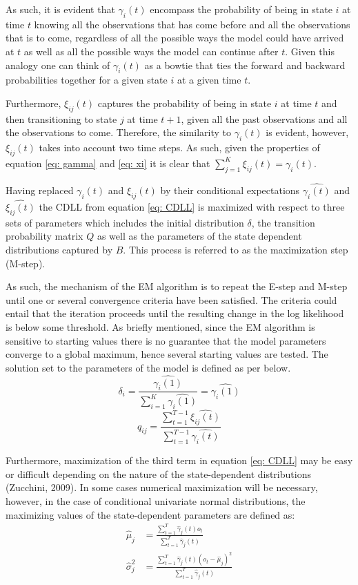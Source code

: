 As such, it is evident that $\gamma_i(t)$ encompass the probability of being in state $i$ at time $t$ knowing all the observations that has come before and all the observations that is to come, regardless of all the possible ways the model could have arrived at $t$ as well as all the possible ways the model can continue after $t$. Given this analogy one can think of $\gamma_i(t)$ as a bowtie that ties the forward and backward probabilities together for a given state $i$ at a given time $t$. 

Furthermore, $\xi_{ij}(t)$ captures the probability of being in state $i$ at time $t$ and then transitioning to state $j$ at time $t+1$, given all the past observations and all the observations to come. Therefore, the similarity to $\gamma_i(t)$ is evident, however, $\xi_{ij}(t)$ takes into account two time steps. As such, given the properties of equation \ref{eq: gamma} and \ref{eq: xi} it is clear that $\sum_{j=1}^K \xi_{ij}(t) = \gamma_i(t)$. 

Having replaced $\gamma_i(t)$ and $\xi_{ij}(t)$ by their conditional expectations $\hat{\gamma_i(t)}$ and $\hat{\xi_{ij}(t)}$ the CDLL from equation \ref{eq: CDLL} is maximized with respect to three sets of parameters which includes the initial distribution $\delta$, the transition probability matrix $Q$ as well as the parameters of the state dependent distributions captured by $B$. This process is referred to as the maximization step (M-step). 

As such, the mechanism of the EM algorithm is to repeat the E-step and M-step until one or several convergence criteria have been satisfied. The criteria could entail that the iteration proceeds until the resulting change in the log likelihood is below some threshold. As briefly mentioned, since the EM algorithm is sensitive to starting values there is no guarantee that the model parameters converge to a global maximum, hence several starting values are tested. The solution set to the parameters of the model is defined as per below. 
\begin{equation}
    \delta_i = \frac{\hat{\gamma_i(1)}}{\sum_{i=1}^K\hat{\gamma_i(1)}} = \hat{\gamma_i(1)}
\end{equation}
\begin{equation}
    q_{ij} = \frac{\sum_{t=1}^{T-1}\hat{\xi_{ij}(t)}}{\sum_{t=1}^{T-1}\hat{\gamma_i(t)}}
\end{equation}

Furthermore, maximization of the third term in equation \ref{eq: CDLL} may be easy or difficult depending on the nature of the state-dependent distributions (Zucchini, 2009). In some cases numerical maximization will be necessary, however, in the case of conditional univariate normal
distributions, the maximizing values of the state-dependent parameters are defined as:
\begin{align}
    \hat\mu_j &= \frac{\sum_{t=1}^T\hat\gamma_j(t)o_t}{\sum_{t=1}^T \hat\gamma_j(t)} \\
    \hat\sigma_j^2 &= \frac{\sum_{t=1}^T\hat\gamma_j(t)(o_t-\hat\mu_j)^2}{\sum_{t=1}^T \hat\gamma_j(t)}
\end{align}

